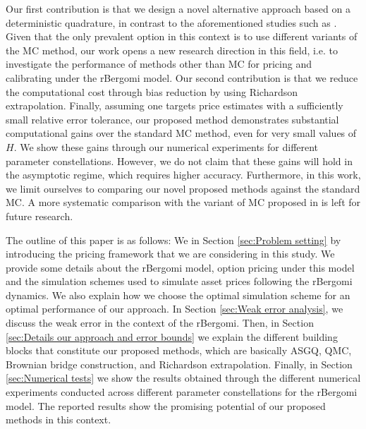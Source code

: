 Our first contribution is that we design a novel alternative approach based on a deterministic quadrature, in contrast to the aforementioned studies such as \cite{mccrickerd2018turbocharging}. Given that the only prevalent option in this context is to use different variants of the MC method, our work opens a new  research direction in this field, i.e.\red{,}  to investigate the performance of methods other than MC for pricing and calibrating under the rBergomi model. Our second contribution is that we reduce the computational cost  through bias reduction by using Richardson extrapolation. Finally, assuming one targets price estimates with a sufficiently small relative error tolerance, our proposed method demonstrates substantial computational gains  over the standard MC method, even for very small values of  $H$. We show  these gains through our numerical experiments for  different parameter constellations. However, we do not claim that these gains will hold in the asymptotic regime, which requires higher accuracy. Furthermore,  in this work, we limit ourselves to comparing our novel proposed methods against the standard MC. A more systematic comparison with the variant of MC proposed in \cite{mccrickerd2018turbocharging} is left for future research. 

The outline of this paper is as follows: We  in Section \ref{sec:Problem setting} by  introducing  the pricing framework that we are considering in this study. We provide some details about the rBergomi model, option pricing under this model and the simulation schemes used to simulate asset prices following the rBergomi dynamics. We also  explain how we choose the optimal simulation scheme for an optimal performance of our approach. In Section \ref{sec:Weak error analysis}, we discuss the weak error in the context of the rBergomi. Then, in Section \ref{sec:Details our approach and error bounds} we explain the different building blocks that constitute our proposed methods, which are basically ASGQ, QMC, Brownian bridge construction, and Richardson extrapolation. Finally, in Section \ref{sec:Numerical tests} we show the results obtained through the different numerical experiments conducted across different parameter constellations for the rBergomi model. The reported results show the promising potential of our proposed methods in this context.